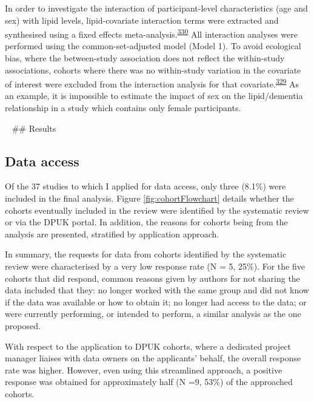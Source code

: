 \documentclass[a4paper, twoside]{templates/ociamthesis}
\begin{document}
In order to investigate the interaction of participant-level characteristics (age and sex) with lipid levels, lipid-covariate interaction terms were extracted and synthesised using a fixed effects meta-analysis.\textsuperscript{\protect\hyperlink{ref-fisher2017}{330}} All interaction analyses were performed using the common-set-adjusted model (Model 1). To avoid ecological bias, where the between-study association does not reflect the within-study associations, cohorts where there was no within-study variation in the covariate of interest were excluded from the interaction analysis for that covariate.\textsuperscript{\protect\hyperlink{ref-burke2017}{329}} As an example, it is impossible to estimate the impact of sex on the lipid/dementia relationship in a study which contains only female participants.

~
\#\# Results

\hypertarget{data-access}{%
\subsection{Data access}\label{data-access}}

Of the 37 studies to which I applied for data access, only three (8.1\%) were included in the final analysis. Figure \ref{fig:cohortFlowchart} details whether the cohorts eventually included in the review were identified by the systematic review or via the DPUK portal. In addition, the reasons for cohorts being from the analysis are presented, stratified by application approach.

In summary, the requests for data from cohorts identified by the systematic review were characterised by a very low response rate (N = 5, 25\%). For the five cohorts that did respond, common reasons given by authors for not sharing the data included that they: no longer worked with the same group and did not know if the data was available or how to obtain it; no longer had access to the data; or were currently performing, or intended to perform, a similar analysis as the one proposed.

With respect to the application to DPUK cohorts, where a dedicated project manager liaises with data owners on the applicants' behalf, the overall response rate was higher. However, even using this streamlined approach, a positive response was obtained for approximately half (N =9, 53\%) of the approached cohorts.

~
\end{document}
